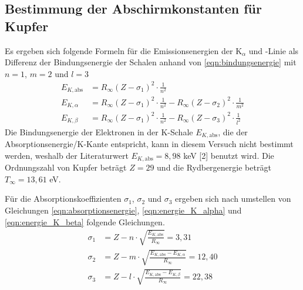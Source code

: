 \documentclass[titlepage = firstcover]{scrartcl}
\begin{document}
      \newpage
      \subsection{Bestimmung der Abschirmkonstanten für Kupfer}
        Es ergeben sich folgende Formeln für die Emissionsenergien der $\text{K}_{\alpha}$ und -Linie als Differenz der Bindungsenergie der Schalen anhand von \autoref{eqn:bindungsenergie} mit $n = 1$, $m = 2$ und $l = 3$
        \begin{align}
          \label{eqn:absorptionsenergie}
          E_{K,\text{abs}} &= R_{\infty} (Z - \sigma_1)^2 \cdot \frac{1}{n^2} \\
          \label{eqn:energie_K_alpha}
          E_{K,\alpha} &= R_{\infty} (Z - \sigma_1)^2 \cdot \frac{1}{n^2} - R_{\infty} (Z - \sigma_2)^2 \cdot \frac{1}{m^2} \\
          \label{eqn:energie_K_beta}
          E_{K,\beta} &= R_{\infty} (Z - \sigma_1)^2 \cdot \frac{1}{n^2} - R_{\infty} (Z - \sigma_3)^2 \cdot \frac{1}{l^2}
        \end{align}
        Die Bindungsenergie der Elektronen in der K-Schale $E_{K,\text{abs}}$, die der Absorptionsenergie/K-Kante entspricht, kann in diesem Versuch nicht bestimmt werden, weshalb der Literaturwert $E_{K,\text{abs}} = 8,98$ keV [2] benutzt wird. Die Ordnungszahl von Kupfer beträgt $Z = 29$ und die Rydbergenergie beträgt $T_{\infty} = 13,61$ eV.

        Für die Absorptionskoeffizienten $\sigma_1$, $\sigma_2$ und $\sigma_3$ ergeben sich nach umstellen von Gleichungen \ref{eqn:absorptionsenergie}, \ref{eqn:energie_K_alpha} und \ref{eqn:energie_K_beta} folgende Gleichungen.
        \begin{align}
          \sigma_1 &= Z - n \cdot \sqrt{\frac{E_{K,\text{abs}}}{R_{\infty}}} = 3,31 \\
          \sigma_2 &= Z - m \cdot \sqrt{\frac{E_{K,\text{abs}} - E_{K,\alpha}}{R_{\infty}}} = 12,40 \\
          \sigma_3 &= Z - l \cdot \sqrt{\frac{E_{K,\text{abs}} - E_{K,\beta}}{R_{\infty}}} = 22,38
        \end{align}      
      
\end{document}
